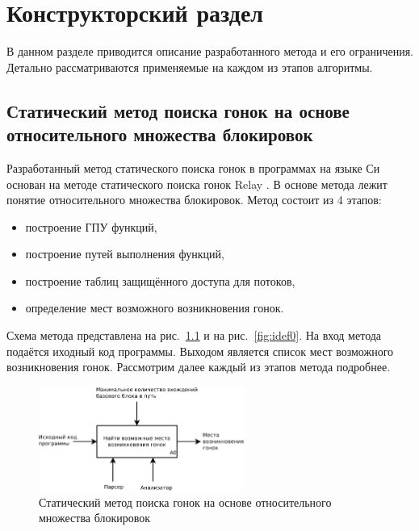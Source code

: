 \chapter{Конструкторский раздел}
\label{cha:design}

В данном разделе приводится описание разработанного метода и его ограничения. Детально рассматриваются применяемые на каждом из этапов алгоритмы.

\section{Статический метод поиска гонок на основе относительного множества блокировок}

Разработанный метод статического поиска гонок в программах на языке Си основан на методе статического поиска гонок Relay \cite{Relay}. В основе метода лежит понятие относительного множества блокировок. Метод состоит из 4 этапов:

\begin{itemize}
  \item построение ГПУ функций,
  \item построение путей выполнения  функций,
  \item построение таблиц защищённого доступа для потоков,
  \item определение мест возможного возникновения гонок.
\end{itemize}

Схема метода представлена на рис.~\ref{fig:idef0-black-box} и на рис.~\ref{fig:idef0}. На вход метода подаётся иходный код программы. Выходом является список мест возможного возникновения гонок. Рассмотрим далее каждый из этапов метода подробнее.

\begin{figure}
  \centering
  \includegraphics[width=0.6\textwidth]{inc/dia/idef0-black-box}
  \caption{Статический метод поиска гонок на основе относительного множества блокировок}
  \label{fig:idef0-black-box}
\end{figure}

